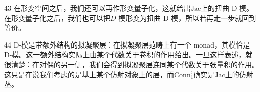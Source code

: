 \begin{srcrem}{43}
在形变空间之后，我们还可以再作形变量子化，这就给出$\mathrm{Jac}$上的扭曲 D-模。在形变量子化之后，我们也可以把$D$-模形变为扭曲 D-模，所以若再走一步就回到等价。
\end{srcrem}

\begin{srcrem}{44}
D-模是带额外结构的拟凝聚层：在拟凝聚层范畴上有一个 monad，其模恰是 D-模。这一额外结构实际上由某个代数关于卷积的作用给出。一旦这样表述，就很清楚：在对偶的另一侧，我们会得到拟凝聚层连同某个代数关于张量积的作用。这只是在说我们考虑的是基上某个仿射对象上的层，而$\mathrm{Conn}^{\flat}_1$确实是$\mathrm{Jac}$上的仿射丛。
\end{srcrem}
